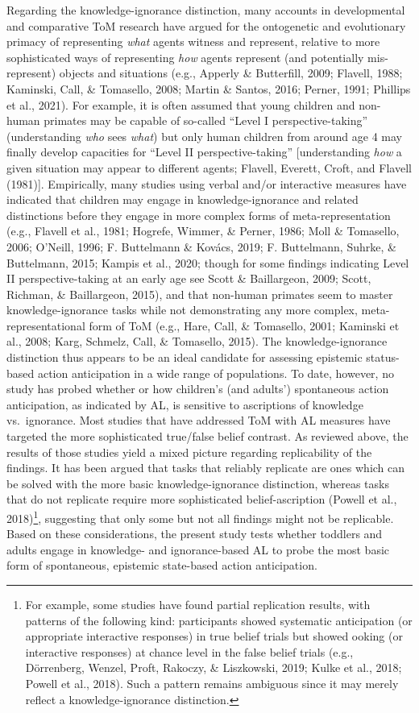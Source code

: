 \documentclass[
  english,
  man,floatsintext]{apa6}
\begin{document}
Regarding the knowledge-ignorance distinction, many accounts in developmental and comparative ToM research have argued for the ontogenetic and evolutionary primacy of representing \emph{what} agents witness and represent, relative to more sophisticated ways of representing \emph{how} agents represent (and potentially mis-represent) objects and situations (e.g., Apperly \& Butterfill, 2009; Flavell, 1988; Kaminski, Call, \& Tomasello, 2008; Martin \& Santos, 2016; Perner, 1991; Phillips et al., 2021). For example, it is often assumed that young children and non-human primates may be capable of so-called ``Level I perspective-taking'' (understanding \emph{who} sees \emph{what}) but only human children from around age 4 may finally develop capacities for ``Level II perspective-taking'' {[}understanding \emph{how} a given situation may appear to different agents; Flavell, Everett, Croft, and Flavell (1981){]}. Empirically, many studies using verbal and/or interactive measures have indicated that children may engage in knowledge-ignorance and related distinctions before they engage in more complex forms of meta-representation (e.g., Flavell et al., 1981; Hogrefe, Wimmer, \& Perner, 1986; Moll \& Tomasello, 2006; O'Neill, 1996; F. Buttelmann \& Kovács, 2019; F. Buttelmann, Suhrke, \& Buttelmann, 2015; Kampis et al., 2020; though for some findings indicating Level II perspective-taking at an early age see Scott \& Baillargeon, 2009; Scott, Richman, \& Baillargeon, 2015), and that non-human primates seem to master knowledge-ignorance tasks while not demonstrating any more complex, meta-representational form of ToM (e.g., Hare, Call, \& Tomasello, 2001; Kaminski et al., 2008; Karg, Schmelz, Call, \& Tomasello, 2015). The knowledge-ignorance distinction thus appears to be an ideal candidate for assessing epistemic status-based action anticipation in a wide range of populations.
To date, however, no study has probed whether or how children's (and adults') spontaneous action anticipation, as indicated by AL, is sensitive to ascriptions of knowledge vs.~ignorance. Most studies that have addressed ToM with AL measures have targeted the more sophisticated true/false belief contrast. As reviewed above, the results of those studies yield a mixed picture regarding replicability of the findings. It has been argued that tasks that reliably replicate are ones which can be solved with the more basic knowledge-ignorance distinction, whereas tasks that do not replicate require more sophisticated belief-ascription (Powell et al., 2018)\footnote{For example, some studies have found partial replication results, with patterns of the following kind: participants showed systematic anticipation (or appropriate interactive responses) in true belief trials but showed ooking (or interactive responses) at chance level in the false belief trials (e.g., Dörrenberg, Wenzel, Proft, Rakoczy, \& Liszkowski, 2019; Kulke et al., 2018; Powell et al., 2018). Such a pattern remains ambiguous since it may merely reflect a knowledge-ignorance distinction.}, suggesting that only some but not all findings might not be replicable. Based on these considerations, the present study tests whether toddlers and adults engage in knowledge- and ignorance-based AL to probe the most basic form of spontaneous, epistemic state-based action anticipation.
\end{document}
